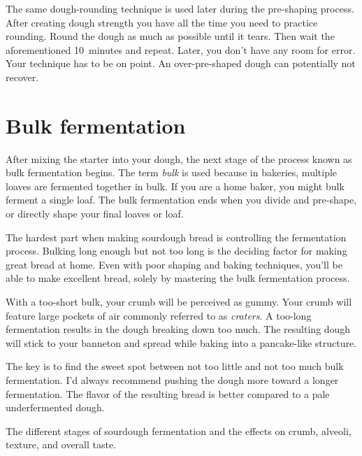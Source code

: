The same dough-rounding technique is used later during
the pre-shaping process. After creating dough strength you
have all the time you need to practice rounding. Round the dough
as much as possible until it tears. Then wait the aforementioned 10~minutes and repeat.
Later, you don't have any room for error. Your technique has to be on point.
An over-pre-shaped dough can potentially not recover.

\section{Bulk fermentation}%
\label{section:bulk-fermentation}

After mixing the starter into your dough, the next stage of
the process known as bulk fermentation begins. The term
\emph{bulk} is used because in bakeries, multiple loaves are fermented
together in bulk. If you are a home baker, you might bulk
ferment a single loaf. The bulk fermentation ends when you
divide and pre-shape, or directly shape your final loaves or loaf.

The hardest part when making sourdough bread is controlling
the fermentation process. Bulking long enough but not too
long is the deciding factor for making great bread at home.
Even with poor shaping and baking techniques, you'll be able
to make excellent bread, solely by mastering the bulk
fermentation process.

With a too-short bulk, your crumb will be
perceived as gummy. Your crumb will feature large pockets of
air commonly referred to as \emph{craters}. A too-long fermentation
results in the dough breaking down too much. The resulting
dough will stick to your banneton and spread while baking
into a pancake-like structure.

The key is to find the sweet spot between not too little
and not too much bulk fermentation. I'd always recommend pushing
the dough more toward a longer fermentation. The
flavor of the resulting bread is better compared to a pale
underfermented dough.

\begin{table}[!htb]
    \begin{center}
        
        \caption[Stages of sourdough fermentation]{The different stages of
            sourdough fermentation and the effects on crumb, alveoli, texture,
            and overall taste.}
    \end{center}
\end{table}

